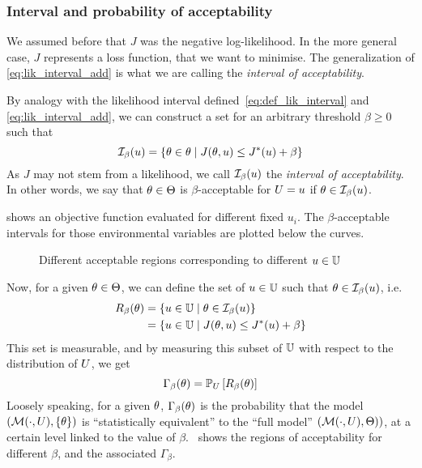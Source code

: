 \documentclass[../../Main_ManuscritThese.tex]{subfiles}
\newcommand\imgpath{/home/victor/acadwriting/Manuscrit/Text/Chapter3/img/}
\begin{document}
  
  \subsubsection{Interval and probability of acceptability}
     \label{ssec:general_cost_prob}
     We assumed before that $J$ was the negative log-likelihood. In
     the more general case, $J$ represents a loss function, that we
     want to minimise. The generalization of
     \cref{eq:lik_interval_add} is what we are calling the
     \emph{interval of acceptability}.
  \begin{definition}
    By analogy with the likelihood interval
    defined~\cref{eq:def_lik_interval} and \cref{eq:lik_interval_add},
    we can construct a set for an arbitrary threshold $\beta \geq 0$
    such that
  \begin{equation}
    \mathcal{I}_{\beta}(u) = \left\{\theta \in \theta \mid J(\theta,u) \leq J^*(u) + \beta \right\}
  \end{equation}
  As $J$ may not stem from a likelihood, we call
  $\mathcal{I}_{\beta}(u)$ the \emph{interval of acceptability}. In
  other words, we say that $\theta\in \Theta$ is $\beta$-acceptable for
  $U=u$ if $\theta \in \mathcal{I}_{\beta}(u)$.
\end{definition}

 shows an objective function
evaluated for different fixed $u_i$. The $\beta$-acceptable intervals
for those environmental variables are plotted below the curves.
\begin{figure}[ht]
  \centering
  
  \caption{\label{fig:lik_interval_threshold} Different acceptable regions corresponding to different $u \in \mathbb{U}$}
\end{figure}

Now, for a given $\theta\in\Theta$, we can define the set of
$u\in \mathbb{U}$ such that $\theta \in \mathcal{I}_{\beta}(u)$, i.e.\
  \begin{align}
    R_{\beta}(\theta) &= \left\{u\in \mathbb{U} \mid \theta \in \mathcal{I}_{\beta}(u) \right\} \\
           &= \left\{u\in \mathbb{U} \mid J(\theta, u)  \leq J^*(u) + \beta \right\}
  \end{align}
  This set is measurable, and by measuring this subset of $\mathbb{U}$
  with respect to the distribution of $U$, we get
  \begin{equation}
    \label{eq:def_gamma_additive}
    \Gamma_\beta(\theta) = \mathbb{P}_U\left[R_{\beta}(\theta)\right]
  \end{equation}
  Loosely speaking, for a given $\theta$, $\Gamma_{\beta}(\theta)$ is the
  probability that the model $(\mathcal{M}(\cdot, U), \{\theta\})$ is
  ``statistically equivalent'' to the ``full model''
  $\left(\mathcal{M}(\cdot, U), \Theta)\right)$, at a certain level
  linked to the value of $\beta$.~\Cref{fig:gamma_beta_increasing}
  shows the regions of acceptability for different $\beta$, and the
  associated $\Gamma_{\beta}$.
\end{document}
